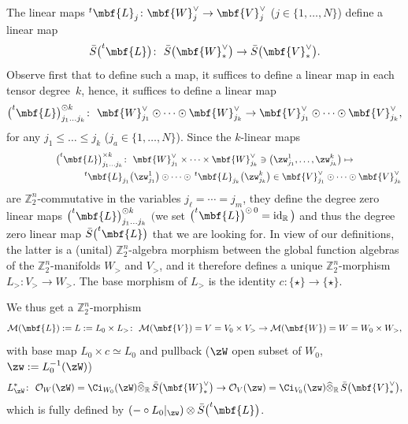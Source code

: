 \documentclass[pdftex]{sigma}%
\newcommand{\op}[1]{\operatorname{#1}}
\newcommand{\R}{{\mathbb R}}
\newcommand{\Z}{{\mathbb Z}}
\def\cM{\cal M}
\def\cO{\mathcal{O}}
\def\cM{\mathcal{M}}
\newcommand{\0}{\otimes}
\newcommand{\id}{\op{id}}
\numberwithin{equation}{section}
\begin{document}
The linear maps $^t\mbf{L}_j\colon \mbf{W}_j^\vee\to \mbf{V}_j^\vee$ ($j\in\{1,\dots, N\}$) define a linear map
\[
{\bar S}\big(^t\mbf{L}\big)\colon\ {\bar S}\big(\mbf{W}_*^\vee\big)\to {\bar S}\big(\mbf{V}_*^\vee\big).
\]
Observe first that to define such a map, it suffices to define a linear map in each tensor degree~$k$, hence, it suffices to define a linear map
\[
\big(^t\mbf{L}\big)^{\odot k}_{j_1\dots j_k}\colon\ \mbf{W}_{j_1}^\vee\odot\cdots\odot\mbf{W}_{j_k}^\vee \to\mbf{V}_{j_1}^\vee\odot\cdots\odot\mbf{V}_{j_k}^\vee,
\]
for any $j_1\le\dots \le j_k$ ($j_a\in\{1,\dots,N\}$). Since the $k$-linear maps
\begin{gather*}
\big(^t\mbf{L}\big)^{\times k}_{j_1\dots j_k}\colon\ \mbf{W}_{j_1}^\vee\times\cdots\times\mbf{W}_{j_k}^\vee\ni \big(\zw^1_{j_1},\dots,\zw^k_{j_k}\big)\mapsto
\\ \hphantom{\big(^t\mbf{L}\big)^{\times k}_{j_1\dots j_k}\colon\ }
^t\mbf{L}_{j_1}\big(\zw^1_{j_1}\big)\odot\cdots\odot\, ^t\mbf{L}_{j_k}\big(\zw^k_{j_k}\big)\in\mbf{V}_{j_1}^\vee\odot\cdots\odot\mbf{V}_{j_k}^\vee
\end{gather*}
are $\Z_2^n$-commutative in the variables $j_\ell=\cdots=j_m$, they define the degree zero linear maps $\big(^t\mbf{L}\big)^{\odot k}_{j_1\dots j_k}$ $\big($we set $\big(^t\mbf{L}\big)^{\odot\, 0}=\id_\R\big)$ and thus the degree zero linear map $\bar S\big(^t\mbf{L}\big)$ that we are looking for. In view of our definitions, the latter is a (unital) $\Z_2^n$-algebra morphism between the global function algebras of the $\Z_2^n$-manifolds $W_>$ and $V_>$, and it therefore defines a unique $\Z_2^n$-morphism $L_>\colon V_>\to W_>$. The base morphism of $L_>$ is the identity $c\colon \{\star\}\to\{\star\}$.

We thus get a $\Z_2^n$-morphism
\begin{gather}\label{ML}
\cM(\mbf{L}):=L:=L_0\times L_>\colon\ \cM(\mbf{V})=V=V_0\times V_>\to \cM(\mbf{W})=W=W_0\times W_>,
\end{gather}
with base map $L_0\times c\simeq L_0$ and pullback ($\zW$ open subset of $W_0$, $\zw:=L_0^{-1}(\zW)$)
\begin{gather}\label{PullProd}
L^*_\zW\colon\ \cO_{W}(\zW)=\Ci_{W_0}(\zW)\widehat{\otimes}_\R\,\bar S\big(\mbf{W}^\vee_*\big)\to \cO_{V}(\zw)=\Ci_{V_0}(\zw)\widehat{\otimes}_\R\,\bar S\big(\mbf{V}^\vee_*\big),
\end{gather}
which is fully defined by $(-\circ L_0|_\zw)\otimes \bar S\big(^t\mbf{L}\big)$.
\end{document}
